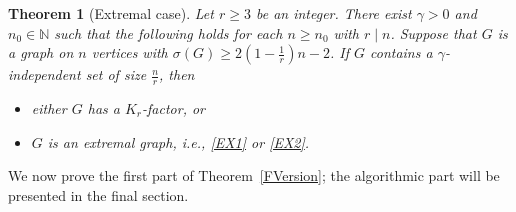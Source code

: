 \documentclass[11pt, a4paper]{article}
\newtheorem{theorem}{Theorem}[section]
\theoremstyle{definition}
\newcommand{\<}{\subseteq}
\begin{document}
\begin{theorem}
    [Extremal case]\label{Extremal case}
   Let $r\geq 3$ be an integer. %
   There exist $\gamma > 0$ and $n_0\in \mathbb{N}$ such that the following holds for each $n\ge n_0$ with $r \mid n$. Suppose that $G$ is a graph on $n$ vertices with $\sigma(G) \ge 2(1-\frac{1}{r})n-2$. 
If $G$ contains a $\gamma$-independent set of size $\frac{n}{r}$, then %
\begin{itemize}
\setlength{\parskip}{0pt}
    \item[$\mathrm{(i)}$] either $G$ has a $K_r$-factor, or 
    \item[$\mathrm{(ii)}$] $G$ is an extremal graph,  i.e., \ref{EX1} or \ref{EX2}. %
\end{itemize}
\end{theorem}

We now prove the first part of Theorem~\ref{FVersion}; the algorithmic part will be presented in the final section.
\end{document}

